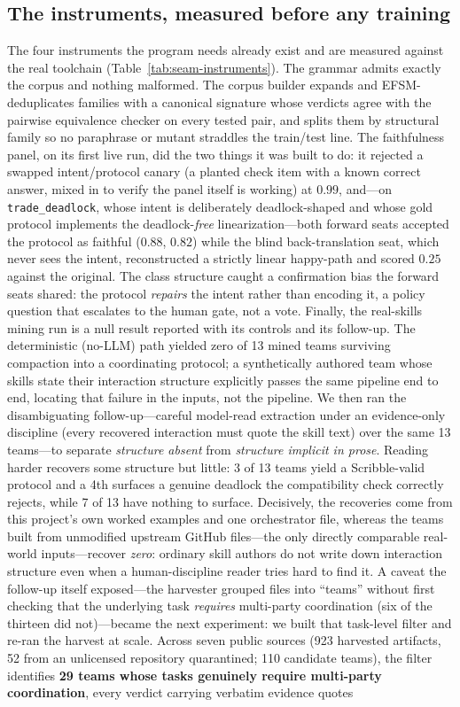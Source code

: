 \documentclass{article}
\begin{document}
\subsection{The instruments, measured before any training}
The four instruments the program needs already exist and are measured against the real toolchain (Table~\ref{tab:seam-instruments}). The grammar admits exactly the corpus and nothing malformed. The corpus builder expands and EFSM-deduplicates families with a canonical signature whose verdicts agree with the pairwise equivalence checker on every tested pair, and splits them by structural family so no paraphrase or mutant straddles the train/test line. The faithfulness panel, on its first live run, did the two things it was built to do: it rejected a swapped intent/protocol canary (a planted check item with a known correct answer, mixed in to verify the panel itself is working) at $0.99$, and---on \texttt{trade\_deadlock}, whose intent is deliberately deadlock-shaped and whose gold protocol implements the deadlock-\emph{free} linearization---both forward seats accepted the protocol as faithful ($0.88$, $0.82$) while the blind back-translation seat, which never sees the intent, reconstructed a strictly linear happy-path and scored $0.25$ against the original. The class structure caught a confirmation bias the forward seats shared: the protocol \emph{repairs} the intent rather than encoding it, a policy question that escalates to the human gate, not a vote. Finally, the real-skills mining run is a null result reported with its controls and its follow-up. The deterministic (no-LLM) path yielded zero of 13 mined teams surviving compaction into a coordinating protocol; a synthetically authored team whose skills state their interaction structure explicitly passes the same pipeline end to end, locating that failure in the inputs, not the pipeline. We then ran the disambiguating follow-up---careful model-read extraction under an evidence-only discipline (every recovered interaction must quote the skill text) over the same 13 teams---to separate \emph{structure absent} from \emph{structure implicit in prose}. Reading harder recovers some structure but little: 3 of 13 teams yield a Scribble-valid protocol and a 4th surfaces a genuine deadlock the compatibility check correctly rejects, while 7 of 13 have nothing to surface. Decisively, the recoveries come from this project's own worked examples and one orchestrator file, whereas the teams built from unmodified upstream GitHub files---the only directly comparable real-world inputs---recover \emph{zero}: ordinary skill authors do not write down interaction structure even when a human-discipline reader tries hard to find it. A caveat the follow-up itself exposed---the harvester grouped files into ``teams'' without first checking that the underlying task \emph{requires} multi-party coordination (six of the thirteen did not)---became the next experiment: we built that task-level filter and re-ran the harvest at scale. Across seven public sources (923 harvested artifacts, 52 from an unlicensed repository quarantined; 110 candidate teams), the filter identifies \textbf{29 teams whose tasks genuinely require multi-party coordination}, every verdict carrying verbatim evidence quotes 
\end{document}
